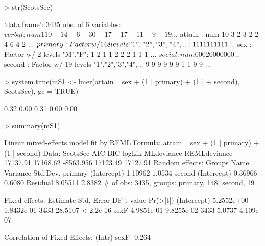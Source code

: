 \documentclass[12pt]{article}
\begin{document}
\begin{Schunk}
\begin{Sinput}
> str(ScotsSec)
\end{Sinput}
\begin{Soutput}
`data.frame':	3435 obs. of  6 variables:
 $ verbal : num  11 0 -14 -6 -30 -17 -17 -11 -9 -19 ...
 $ attain : num  10 3 2 3 2 2 4 6 4 2 ...
 $ primary: Factor w/ 148 levels "1","2","3","4",..: 1 1 1 1 1 1 1 1 1 1 ...
 $ sex    : Factor w/ 2 levels "M","F": 1 2 1 1 2 2 2 1 1 1 ...
 $ social : num  0 0 0 20 0 0 0 0 0 0 ...
 $ second : Factor w/ 19 levels "1","2","3","4",..: 9 9 9 9 9 9 1 1 9 9 ...
\end{Soutput}
\begin{Sinput}
> system.time(mS1 <- lmer(attain ~ sex + (1 | primary) + (1 | 
+     second), ScotsSec), gc = TRUE)
\end{Sinput}
\begin{Soutput}
[1] 0.32 0.00 0.31 0.00 0.00
\end{Soutput}
\begin{Sinput}
> summary(mS1)
\end{Sinput}
\begin{Soutput}
Linear mixed-effects model fit by REML
Formula: attain ~ sex + (1 | primary) + (1 | second) 
   Data: ScotsSec 
      AIC      BIC    logLik MLdeviance REMLdeviance
 17137.91 17168.62 -8563.956   17123.49     17127.91
Random effects:
 Groups   Name        Variance Std.Dev.
 primary  (Intercept) 1.10962  1.0534  
 second   (Intercept) 0.36966  0.6080  
 Residual             8.05511  2.8382  
# of obs: 3435, groups: primary, 148; second, 19

Fixed effects:
              Estimate Std. Error   DF t value  Pr(>|t|)
(Intercept) 5.2552e+00 1.8432e-01 3433 28.5107 < 2.2e-16
sexF        4.9851e-01 9.8255e-02 3433  5.0737 4.109e-07

Correlation of Fixed Effects:
     (Intr)
sexF -0.264
\end{Soutput}
\end{Schunk}
\end{document}
